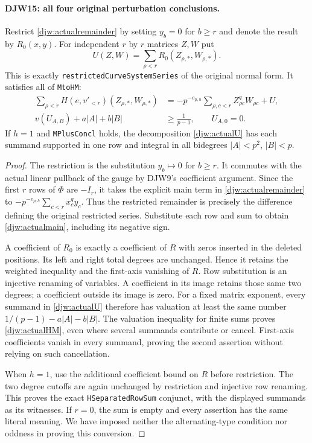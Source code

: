 \paragraph{DJW15: all four original perturbation conclusions.}
\label{claim:DJW15}
Restrict \eqref{djw:actualremainder} by setting $y_b=0$ for
$b\ge r$ and denote the result by $R_0(x,y)$.
For independent $r$ by $r$ matrices $Z,W$ put
\begin{equation}
 U(Z,W)=\sum_{\rho<r}R_0(Z_{\rho,*},W_{\rho,*}).
 \label{djw:actualU}
\end{equation}
This is exactly
\texttt{restrictedCurveSystemSeries} of the original normal form.
It satisfies all of \texttt{MtoHM}:
\begin{align}
 \sum_{\rho<r}H(e,v'_{<r})(Z_{\rho,*},W_{\rho,*})
   &=-p^{-e_{p,h}}\sum_{\rho,c<r}Z_{\rho c}^qW_{\rho c}+U,
        \label{djw:actualmain}\\
 v(U_{A,B})+a|A|+b|B|&\ge\frac1{p-1},\qquad U_{A,0}=0.
        \label{djw:actualHM}
\end{align}
If $h=1$ and \texttt{MPlusConcl} holds, the decomposition
\eqref{djw:actualU} has each summand supported in one row and
integral in all bidegrees $|A|<p^2$, $|B|<p$.

\begin{proof}
The restriction is the substitution $y_b\mapsto0$ for $b\ge r$.
It commutes with the actual linear pullback of the gauge by DJW9's
coefficient argument.  Since the first $r$ rows of $\Phi$ are
$-I_r$, it takes the explicit main term in
\eqref{djw:actualremainder} to
$-p^{-e_{p,h}}\sum_{c<r}x_c^qy_c$.
Thus the restricted remainder is precisely the difference defining
the original restricted series.  Substitute each row and sum to
obtain \eqref{djw:actualmain}, including its negative sign.

A coefficient of $R_0$ is exactly a coefficient of $R$ with zeros
inserted in the deleted positions.  Its left and right total degrees
are unchanged.  Hence it retains the weighted inequality and
the first-axis vanishing of $R$.  Row substitution is an injective
renaming of variables.  A coefficient in its image retains those
same two degrees; a coefficient outside its image is zero.
For a fixed matrix exponent, every summand in
\eqref{djw:actualU} therefore has valuation at least the same
number $1/(p-1)-a|A|-b|B|$.  The valuation inequality for finite
sums proves \eqref{djw:actualHM}, even where several summands
contribute or cancel.  First-axis coefficients vanish in every
summand, proving the second assertion without relying on such
cancellation.

When $h=1$, use the additional coefficient bound on $R$ before
restriction.  The two degree cutoffs are again unchanged by
restriction and injective row renaming.  This proves the exact
\texttt{HSeparatedRowSum} conjunct, with the displayed summands
as its witnesses.  If $r=0$, the sum is empty and every assertion
has the same literal meaning.  We have imposed neither the
alternating-type condition nor oddness in proving this conversion.
\end{proof}

